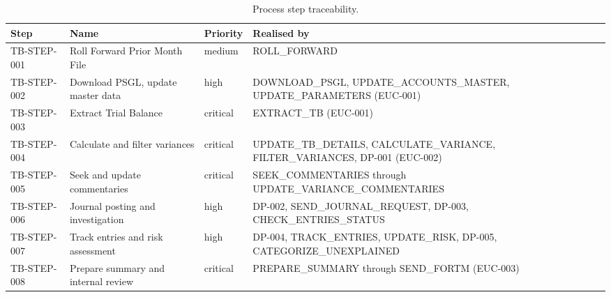 \begin{table}[htbp]
\caption{Process step traceability.}\label{tab:traceability}
\centering
\footnotesize
\begin{tabularx}{\linewidth}{@{}p{2.1cm}p{3.9cm}lX@{}}
\toprule
\textbf{Step} & \textbf{Name} & \textbf{Priority} & \textbf{Realised by} \\ \midrule
TB-STEP-001 & Roll Forward Prior Month File        & medium   & ROLL\_FORWARD \\
TB-STEP-002 & Download PSGL, update master data    & high     & DOWNLOAD\_PSGL, UPDATE\_ACCOUNTS\_MASTER, UPDATE\_PARAMETERS (EUC-001) \\
TB-STEP-003 & Extract Trial Balance                & critical & EXTRACT\_TB (EUC-001) \\
TB-STEP-004 & Calculate and filter variances       & critical & UPDATE\_TB\_DETAILS, CALCULATE\_VARIANCE, FILTER\_VARIANCES, DP-001 (EUC-002) \\
TB-STEP-005 & Seek and update commentaries         & critical & SEEK\_COMMENTARIES through UPDATE\_VARIANCE\_COMMENTARIES \\
TB-STEP-006 & Journal posting and investigation    & high     & DP-002, SEND\_JOURNAL\_REQUEST, DP-003, CHECK\_ENTRIES\_STATUS \\
TB-STEP-007 & Track entries and risk assessment    & high     & DP-004, TRACK\_ENTRIES, UPDATE\_RISK, DP-005, CATEGORIZE\_UNEXPLAINED \\
TB-STEP-008 & Prepare summary and internal review  & critical & PREPARE\_SUMMARY through SEND\_FORTM (EUC-003) \\
\bottomrule
\end{tabularx}
\end{table}
